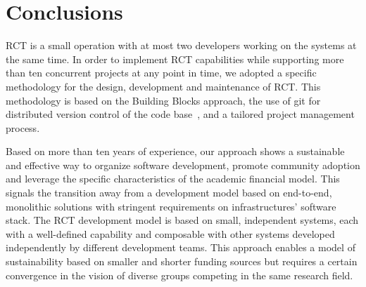 \documentclass[preprint,12pt, a4paper]{elsarticle}
\begin{document}
\section{Conclusions}\label{sec:conclusions}

RCT is a small operation with at most two developers working on the systems
at the same time. In order to implement RCT capabilities while supporting
more than ten concurrent projects at any point in time, we adopted a
specific methodology for the design, development and maintenance of RCT\@.
This methodology is based on the Building Blocks approach, the use of git for
distributed version control of the code base~\cite{github-rct}, and a
tailored project management process.

Based on more than ten years of experience, our approach shows a sustainable
and effective way to organize software development, promote community adoption
and leverage the specific characteristics of the academic financial model.
This signals the transition away from a development model based on end-to-end,
monolithic solutions with stringent requirements on infrastructures' software
stack. The RCT development model is based on small, independent systems, each
with a well-defined capability and composable with other systems developed
independently by different development teams. This approach enables a model of
sustainability based on smaller and shorter funding sources but requires a
certain convergence in the vision of diverse groups competing in the same
research field.


\end{document}
